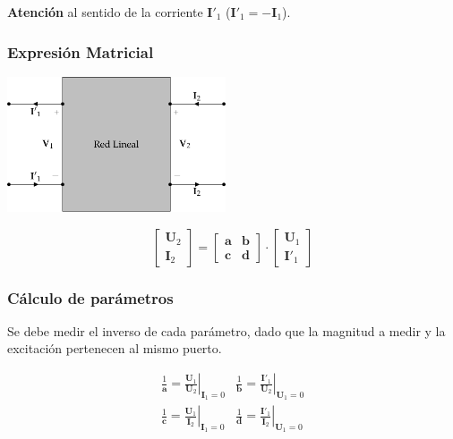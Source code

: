 \textbf{Atención} al sentido de la corriente \(\mathbf{I'}_1\) (\(\mathbf{I'}_1 = - \mathbf{I}_1\)).


\subsubsection{Expresión Matricial}
\label{sec:orgca7fb03}

\includegraphics[height=4cm]{../figs/cuadripolo_transmision_inversa.pdf}


\[
  \left[
    \begin{array}{c}
      \mathbf{U}_2\\
      \mathbf{I}_2
    \end{array}
  \right] =
  \left[
    \begin{array}{cc}
      \mathbf{a} & \mathbf{b}\\
      \mathbf{c} & \mathbf{d}
    \end{array}
  \right] \cdot
  \left[
    \begin{array}{c}
      \mathbf{U}_1\\
      \mathbf{I'}_1
    \end{array}
  \right]
\]

\subsubsection{Cálculo de parámetros}
\label{sec:org67b01c0}
Se debe medir el inverso de cada parámetro, dado que la magnitud a medir y la excitación pertenecen al mismo puerto.

\renewcommand{\arraystretch}{3}
\[
  \begin{array}{cc}
    \frac{1}{\mathbf{a}} = \left.\frac{\mathbf{U}_1}{\mathbf{U}_2}\right\rvert_{\mathbf{I}_1 = 0} &
    \frac{1}{\mathbf{b}} = \left.\frac{\mathbf{I'}_1}{\mathbf{U}_2}\right\rvert_{\mathbf{U}_1 = 0}\\
    \frac{1}{\mathbf{c}} = \left.\frac{\mathbf{U}_1}{\mathbf{I}_2}\right\rvert_{\mathbf{I}_1 = 0} &
    \frac{1}{\mathbf{d}} = \left.\frac{\mathbf{I'}_1}{\mathbf{I}_2}\right\rvert_{\mathbf{U}_1 = 0}\\
  \end{array}
\]


